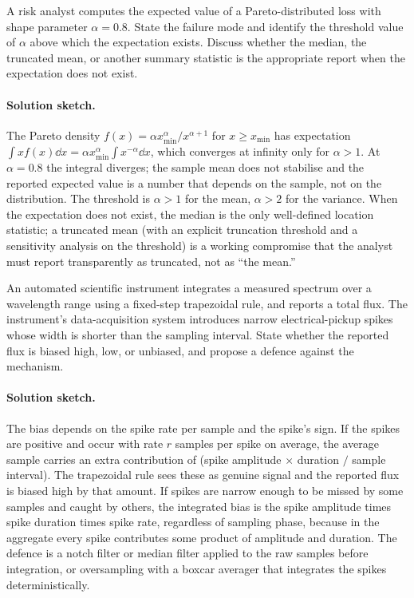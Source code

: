 \begin{exercise}
A risk analyst computes the expected value of a Pareto-distributed
loss with shape parameter $\alpha = 0.8$. State the failure mode
and identify the threshold value of $\alpha$ above which the
expectation exists. Discuss whether the median, the truncated
mean, or another summary statistic is the appropriate report
when the expectation does not exist.
\end{exercise}

\paragraph{Solution sketch.}
The Pareto density $f(x) = \alpha x_{\min}^{\alpha} / x^{\alpha +
1}$ for $x \geq x_{\min}$ has expectation
$\int x f(x) \dd x = \alpha x_{\min}^{\alpha} \int x^{-\alpha} \dd
x$, which converges at infinity only for $\alpha > 1$. At $\alpha
= 0.8$ the integral diverges; the sample mean does not stabilise
and the reported expected value is a number that depends on the
sample, not on the distribution. The threshold is $\alpha > 1$
for the mean, $\alpha > 2$ for the variance. When the
expectation does not exist, the median is the only well-defined
location statistic; a truncated mean (with an explicit truncation
threshold and a sensitivity analysis on the threshold) is a
working compromise that the analyst must report transparently as
truncated, not as ``the mean.''

\begin{exercise}
An automated scientific instrument integrates a measured spectrum
over a wavelength range using a fixed-step trapezoidal rule, and
reports a total flux. The instrument's data-acquisition system
introduces narrow electrical-pickup spikes whose width is shorter
than the sampling interval. State whether the reported flux is
biased high, low, or unbiased, and propose a defence against the
mechanism.
\end{exercise}

\paragraph{Solution sketch.}
The bias depends on the spike rate per sample and the spike's
sign. If the spikes are positive and occur with rate $r$ samples
per spike on average, the average sample carries an extra
contribution of (spike amplitude $\times$ duration $/$ sample
interval). The trapezoidal rule sees these as genuine signal and
the reported flux is biased high by that amount. If spikes are
narrow enough to be missed by some samples and caught by others,
the integrated bias is the spike amplitude times spike duration
times spike rate, regardless of sampling phase, because in the
aggregate every spike contributes some product of amplitude and
duration. The defence is a notch filter or median filter applied
to the raw samples before integration, or oversampling with a
boxcar averager that integrates the spikes deterministically.


